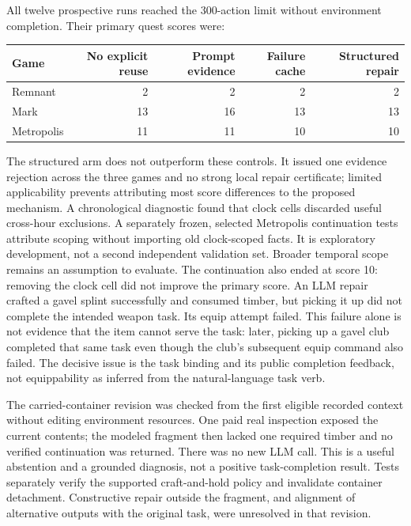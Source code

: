 \documentclass[11pt]{article}
\theoremstyle{definition}
\begin{document}
All twelve prospective runs reached the 300-action limit without environment
completion. Their primary quest scores were:
\begin{center}
\begin{tabular}{lrrrr}
Game & No explicit reuse & Prompt evidence & Failure cache & Structured repair\\
\hline
Remnant & 2 & 2 & 2 & 2\\
Mark & 13 & 16 & 13 & 13\\
Metropolis & 11 & 11 & 10 & 10
\end{tabular}
\end{center}
The structured arm does not outperform these controls. It issued one
evidence rejection across the three games and no strong local repair
certificate; limited applicability prevents attributing most score differences
to the proposed mechanism. A chronological diagnostic found that clock cells
discarded useful cross-hour exclusions. A separately frozen, selected
Metropolis continuation tests attribute scoping without importing old
clock-scoped facts. It is exploratory development, not a second independent
validation set. Broader temporal scope remains an assumption to evaluate.
The continuation also ended at score 10: removing the clock cell did not improve
the primary score. An LLM repair crafted a gavel splint successfully and consumed
timber, but picking it up did not complete the intended weapon task. Its equip
attempt failed. This failure alone is not evidence that the item cannot serve
the task: later, picking up a gavel club completed that same task even though
the club's subsequent equip command also failed. The decisive issue is the
task binding and its public completion feedback, not equippability as inferred
from the natural-language task verb.

The carried-container revision was checked from the first eligible recorded
context without editing environment resources. One paid real inspection exposed
the current contents; the modeled fragment then lacked one required timber and
no verified continuation was returned. There was no new LLM call. This is a
useful abstention and a grounded diagnosis, not a positive task-completion result.
Tests separately verify the supported craft-and-hold policy and invalidate
container detachment. Constructive repair outside the fragment, and alignment
of alternative outputs with the original task, were unresolved in that revision.
\end{document}
